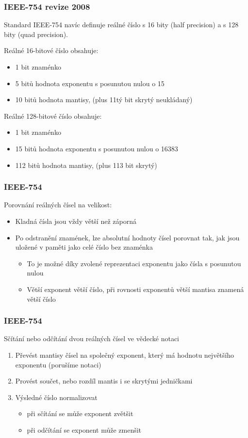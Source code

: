 \documentclass{beamer}
\begin{document}
\begin{frame}
\frametitle{IEEE-754 revize 2008 }

Standard IEEE-754 navíc definuje reálné číslo s 16 bity (half precision) a s 128 bity (quad precision).

Reálné 16-bitové číslo obsahuje:
\begin{itemize}
\item 1 bit znaménko 
\item 5 bitů hodnota exponentu s posunutou nulou o 15
\item 10 bitů hodnota mantisy, (plus 11tý bit skrytý neukládaný)
\end{itemize}
\bigskip
Reálné 128-bitové číslo obsahuje:
\begin{itemize}
\item 1 bit znaménko 
\item 15 bitů hodnota exponentu s posunutou nulou o 16383
\item 112 bitů hodnota mantisy, (plus 113 bit skrytý)
\end{itemize}

\end{frame}


\begin{frame}
\frametitle{IEEE-754 }

Porovnání reálných čísel na velikost:
\begin{itemize}
\item Kladná čísla jsou vždy větší než záporná
\item Po odstranění znamének, lze absolutní hodnoty čísel porovnat tak, jak jsou uložené v paměti jako celé číslo bez znaménka
\begin{itemize}
\item To je možné díky zvolené reprezentaci exponentu jako čísla s posunutou nulou
\item Větší exponent větší číslo, při rovnosti exponentů větší mantisa znamená větší číslo
\end{itemize}
\end{itemize}
\end{frame}


\begin{frame}
\frametitle{IEEE-754}

Sčítání nebo odčítání dvou reálných čísel ve vědecké notaci
\begin{enumerate}
\item Převést mantisy čísel na společný exponent, který má hodnotu největšího exponentu (porušíme notaci)
\item Provést součet, nebo rozdíl mantis i se skrytými jedničkami
\item Výsledné číslo normalizovat
\begin{itemize}
\item při sčítání se může exponent zvětšit
\item při odčítání se exponent může zmenšit
\end{itemize}
\end{enumerate}

\end{frame}
\end{document}
